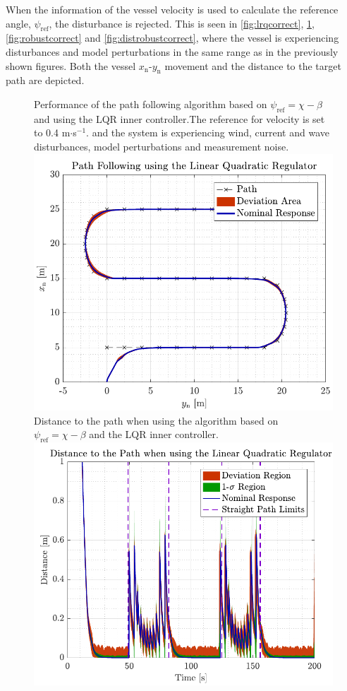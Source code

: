 When the information of the vessel velocity is used to calculate the reference angle, $\psi_\mathrm{ref}$, the disturbance is rejected. This is seen in \autoref{fig:lrqcorrect}, \ref{fig:distlqr}, \ref{fig:robustcorrect} and \ref{fig:distrobustcorrect}, where the vessel is experiencing disturbances and model perturbations in the same range as in the previously shown figures. Both the vessel $x_\mathrm{n}$-$y_\mathrm{n}$ movement and the distance to the target path are depicted. 

\begin{figure}[H]
	\captionbox 
	{            
		Performance of the path following algorithm based on $\psi_\mathrm{ref}=\chi-\beta$ and using the LQR inner controller.The reference for velocity is set to \num{0.4} m$\cdot$s$^{-1}$. and the system is experiencing wind, current and wave disturbances, model perturbations and measurement noise.                
		\label{fig:lrqcorrect}                                  
	}                                                                 
	{                                                                  
		\includegraphics[width=.45\textwidth]{figures/path_lqr}         
	}                                                                    
	\hspace{5pt}                                                          
	\captionbox 
	{       
		Distance to the path when using the algorithm based on $\psi_\mathrm{ref}=\chi-\beta$ and the LQR inner controller. \label{fig:distlqr}                                   
	}                                                     
	{                                                                        
		\includegraphics[width=.45\textwidth]{figures/dist_lqr}            
	}                                                                            
\end{figure}
